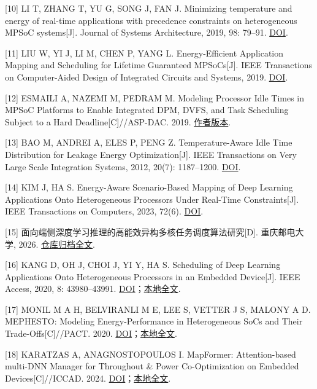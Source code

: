 {[}10{]} LI T, ZHANG T, YU G, SONG J, FAN J. Minimizing temperature and energy of real-time applications with precedence constraints on heterogeneous MPSoC systems{[}J{]}. Journal of Systems Architecture, 2019, 98: 79--91. \href{https://doi.org/10.1016/j.sysarc.2019.07.001}{DOI}.

{[}11{]} LIU W, YI J, LI M, CHEN P, YANG L. Energy-Efficient Application Mapping and Scheduling for Lifetime Guaranteed MPSoCs{[}J{]}. IEEE Transactions on Computer-Aided Design of Integrated Circuits and Systems, 2019. \href{https://doi.org/10.1109/TCAD.2018.2801242}{DOI}.

{[}12{]} ESMAILI A, NAZEMI M, PEDRAM M. Modeling Processor Idle Times in MPSoC Platforms to Enable Integrated DPM, DVFS, and Task Scheduling Subject to a Hard Deadline{[}C{]}//ASP-DAC. 2019. \href{https://arxiv.org/abs/1812.07723}{作者版本}.

{[}13{]} BAO M, ANDREI A, ELES P, PENG Z. Temperature-Aware Idle Time Distribution for Leakage Energy Optimization{[}J{]}. IEEE Transactions on Very Large Scale Integration Systems, 2012, 20(7): 1187--1200. \href{https://doi.org/10.1109/TVLSI.2011.2157542}{DOI}.

{[}14{]} KIM J, HA S. Energy-Aware Scenario-Based Mapping of Deep Learning Applications Onto Heterogeneous Processors Under Real-Time Constraints{[}J{]}. IEEE Transactions on Computers, 2023, 72(6). \href{https://doi.org/10.1109/TC.2022.3218991}{DOI}.

{[}15{]} 面向端侧深度学习推理的高能效异构多核任务调度算法研究{[}D{]}. 重庆邮电大学, 2026. \href{https://github.com/YBEMR/paper/blob/main/main.pdf}{仓库归档全文}.

{[}16{]} KANG D, OH J, CHOI J, YI Y, HA S. Scheduling of Deep Learning Applications Onto Heterogeneous Processors in an Embedded Device{[}J{]}. IEEE Access, 2020, 8: 43980--43991. \href{https://doi.org/10.1109/ACCESS.2020.2977496}{DOI}；\href{https://github.com/YBEMR/paper/blob/main/papers/2020_Kang_Heterogeneous_DL_Scheduling.pdf}{本地全文}.

{[}17{]} MONIL M A H, BELVIRANLI M E, LEE S, VETTER J S, MALONY A D. MEPHESTO: Modeling Energy-Performance in Heterogeneous SoCs and Their Trade-Offs{[}C{]}//PACT. 2020. \href{https://doi.org/10.1145/3410463.3414671}{DOI}；\href{https://github.com/YBEMR/paper/blob/main/papers/2020_Monil_MEPHESTO_author.pdf}{本地全文}.

{[}18{]} KARATZAS A, ANAGNOSTOPOULOS I. MapFormer: Attention-based multi-DNN Manager for Throughout \& Power Co-Optimization on Embedded Devices{[}C{]}//ICCAD. 2024. \href{https://doi.org/10.1145/3676536.3676724}{DOI}；\href{https://github.com/YBEMR/paper/blob/main/papers/2024_MapFormer_Attention-basedmulti-DNNManagerfor.pdf}{本地全文}.

